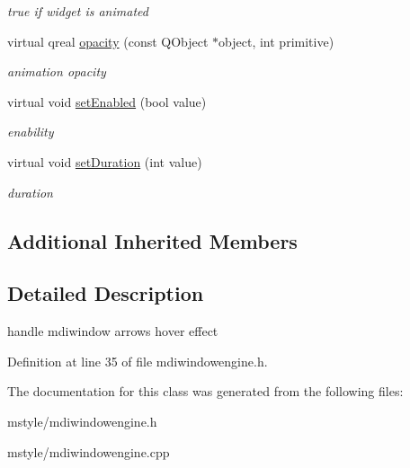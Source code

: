 \begin{DoxyCompactItemize}
\begin{DoxyCompactList}\small\item\em true if widget is animated \end{DoxyCompactList}\item 
\mbox{\label{class_mdi_window_engine_a11b1170c3b5bded1cfa172ea82cc6213}} 
virtual qreal \hyperlink{class_mdi_window_engine_a11b1170c3b5bded1cfa172ea82cc6213}{opacity} (const Q\+Object $\ast$object, int primitive)
\begin{DoxyCompactList}\small\item\em animation opacity \end{DoxyCompactList}\item 
\mbox{\label{class_mdi_window_engine_a2801c6b8d8199e24f5a3ddf9b35e2418}} 
virtual void \hyperlink{class_mdi_window_engine_a2801c6b8d8199e24f5a3ddf9b35e2418}{set\+Enabled} (bool value)
\begin{DoxyCompactList}\small\item\em enability \end{DoxyCompactList}\item 
\mbox{\label{class_mdi_window_engine_a31836d1410d1b8aa38cd8120a85b3043}} 
virtual void \hyperlink{class_mdi_window_engine_a31836d1410d1b8aa38cd8120a85b3043}{set\+Duration} (int value)
\begin{DoxyCompactList}\small\item\em duration \end{DoxyCompactList}\end{DoxyCompactItemize}
\subsection*{Additional Inherited Members}


\subsection{Detailed Description}
handle mdiwindow arrows hover effect 

Definition at line 35 of file mdiwindowengine.\+h.



The documentation for this class was generated from the following files\+:\begin{DoxyCompactItemize}
\item 
mstyle/mdiwindowengine.\+h\item 
mstyle/mdiwindowengine.\+cpp\end{DoxyCompactItemize}
